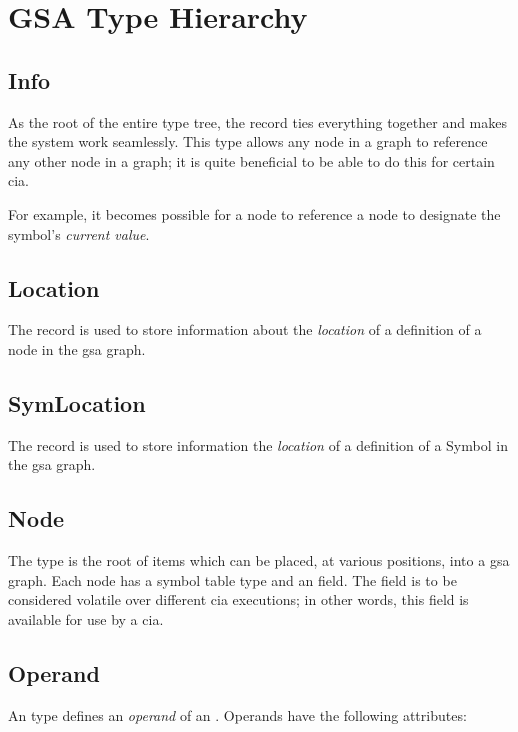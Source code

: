 \section{GSA Type Hierarchy}
\subsection{Info}

As the root of the entire type tree, the  record ties
everything together and makes the system work seamlessly.  This type
allows any node in a graph to reference any other node in a graph; it
is quite beneficial to be able to do this for certain \ac{cia}.

For example, it becomes possible for a  node to reference
a  node to designate the symbol's \emph{current value}.

\subsection{Location}

The  record is used to store information about the
\emph{location} of a definition of a node in the \ac{gsa} graph.

\subsection{SymLocation}

The  record is used to store information the
\emph{location} of a definition of a Symbol in the \ac{gsa} graph.

\subsection{Node}

The  type is the root of items which can be placed, at
various positions, into a \ac{gsa} graph.  Each node has a symbol
table type and an  field.  The  field is to be
considered volatile over different \ac{cia} executions; in other
words, this field is available for use by a \ac{cia}.

\subsection{Operand}\label{th:operand}

An  type defines an \emph{operand} of an
.  Operands have the following attributes:

